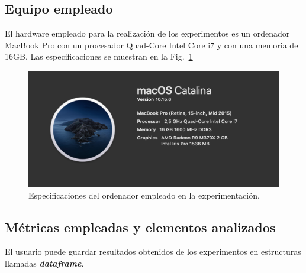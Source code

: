 \subsection{Equipo empleado}

El hardware empleado para la realización de los experimentos es un ordenador MacBook Pro con un procesador Quad-Core Intel Core i7 y con una memoria de 16GB. Las especificaciones se muestran en la Fig.~\ref{fig:computer_specs}
\begin{figure}
    \centering
    \includegraphics[scale=0.5]{cap5_experimentacion/images/computer_specs.png}
    \caption{Especificaciones del ordenador empleado en la experimentación.}
    \label{fig:computer_specs}
\end{figure}

\subsection{Métricas empleadas y elementos analizados}

El usuario puede guardar resultados obtenidos de los experimentos en estructuras llamadas \textbf{\textit{dataframe}}. \\

